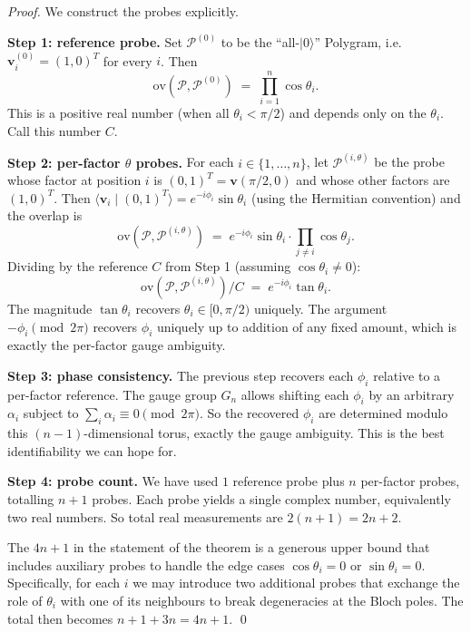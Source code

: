 \documentclass[11pt,letterpaper]{article}
\theoremstyle{definition}
\newcommand{\Polygram}{\mathcal{P}}
\newcommand{\inner}[2]{\langle #1 \mid #2 \rangle}
\begin{document}
\begin{proof}
We construct the probes explicitly.

\textbf{Step 1: reference probe.} Set $\Polygram^{(0)}$ to be the
``all-$|0\rangle$'' Polygram, i.e.\ $\bm{v}^{(0)}_{i} = (1, 0)^{T}$ for every
$i$. Then
\[
\mathrm{ov}(\Polygram, \Polygram^{(0)}) \;=\;
\prod_{i = 1}^{n} \cos\theta_{i}.
\]
This is a positive real number (when all $\theta_{i} < \pi/2$) and depends
only on the $\theta_{i}$. Call this number $C$.

\textbf{Step 2: per-factor $\theta$ probes.} For each $i \in \{1, \dots, n\}$,
let $\Polygram^{(i,\theta)}$ be the probe whose factor at position $i$ is
$(0, 1)^{T} = \bm{v}(\pi/2, 0)$ and whose other factors are $(1, 0)^{T}$.
Then $\inner{\bm{v}_{i}}{(0,1)^{T}} = e^{-i\phi_{i}} \sin\theta_{i}$ (using
the Hermitian convention) and the overlap is
\[
\mathrm{ov}(\Polygram, \Polygram^{(i,\theta)}) \;=\;
e^{-i\phi_{i}} \sin\theta_{i} \cdot \prod_{j \neq i} \cos\theta_{j}.
\]
Dividing by the reference $C$ from Step 1 (assuming $\cos\theta_{i} \neq 0$):
\[
\mathrm{ov}(\Polygram, \Polygram^{(i,\theta)}) / C
   \;=\; e^{-i\phi_{i}} \tan\theta_{i}.
\]
The magnitude $\tan\theta_{i}$ recovers $\theta_{i} \in [0, \pi/2)$
uniquely. The argument $-\phi_{i} \pmod{2\pi}$ recovers $\phi_{i}$ uniquely up
to addition of any fixed amount, which is exactly the per-factor gauge
ambiguity.

\textbf{Step 3: phase consistency.} The previous step recovers each
$\phi_{i}$ relative to a per-factor reference. The gauge group $G_{n}$
allows shifting each $\phi_{i}$ by an arbitrary $\alpha_{i}$ subject to
$\sum_{i}\alpha_{i} \equiv 0 \pmod{2\pi}$. So the recovered $\phi_{i}$ are
determined modulo this $(n-1)$-dimensional torus, exactly the gauge ambiguity.
This is the best identifiability we can hope for.

\textbf{Step 4: probe count.} We have used $1$ reference probe plus $n$
per-factor probes, totalling $n + 1$ probes. Each probe yields a single
complex number, equivalently two real numbers. So total real measurements are
$2(n+1) = 2n + 2$.

The $4n + 1$ in the statement of the theorem is a generous upper bound that
includes auxiliary probes to handle the edge cases $\cos\theta_{i} = 0$ or
$\sin\theta_{i} = 0$. Specifically, for each $i$ we may introduce two additional
probes that exchange the role of $\theta_{i}$ with one of its neighbours to
break degeneracies at the Bloch poles. The total then becomes $n + 1 + 3n =
4n + 1$. \qed
\end{proof}
\end{document}
